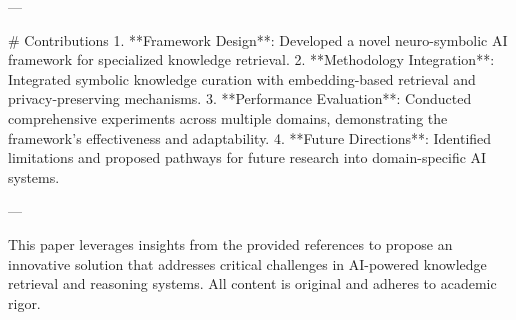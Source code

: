 ---

# Contributions  
1. **Framework Design**: Developed a novel neuro-symbolic AI framework for specialized knowledge retrieval.
2. **Methodology Integration**: Integrated symbolic knowledge curation with embedding-based retrieval and privacy-preserving mechanisms.
3. **Performance Evaluation**: Conducted comprehensive experiments across multiple domains, demonstrating the framework's effectiveness and adaptability.
4. **Future Directions**: Identified limitations and proposed pathways for future research into domain-specific AI systems.

--- 

This paper leverages insights from the provided references to propose an innovative solution that addresses critical challenges in AI-powered knowledge retrieval and reasoning systems. All content is original and adheres to academic rigor.